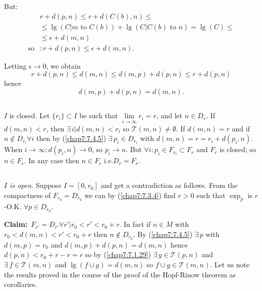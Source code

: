 But:
\begin{align*}
& r+d(p,n)\leq r+d(C(b),n)\leq\\
&\leq\lg(C|m\text{ \  to \ }C(b))+\lg(C|C(b)\text{ \ to
    \ }n)=\lg(C)\leq\\
&\leq \epsilon+d(m,n)\\
\text{so} &: r+d(p,n)\leq \epsilon+d(m,n). 
\end{align*}

Letting $\epsilon\to 0$, we obtain
$$
r+d(p,n)\leq d(m,n)\leq d(m,p)+d(p,n)\leq r+d(p,n)
$$
hence
$$
d(m,p)+d(p,n)=d(m,n).
$$

\setcounter{subsection}{5}
\subsection{}\label{chap7:7.4.6}
$I$ is closed. Let $\{r_{i}\}\subset I$ be such that
$\lim\limits_{i\to \infty} r_{i}=r$, and \pageoriginale let $n\in
D_{r}$. If $d(m,n)<r$, then $\exists\, i|d(m,n)<r_{i}$ so
$\mathscr{T}(m,n)\neq \emptyset$. If $d(m,n)=r$ and if $n\not\in
D_{r_{i}}\forall i$ then by (\ref{chap7:7.4.5}) $\exists\, p_{i}\in
D_{r_{i}}$ with $d(m,n)=r=r_{i}+d(p_{i},n)$. When $i\to
\infty:d(p_{i},n)\to 0$, so $p_{i}\to n$. But $\forall i:p_{i}\in
F_{r_{i}}\subset F_{r}$ and $F_{r}$ is closed; so $n\in F_{r}$. In any
case then $n\in F_{r}$ i.e.\@ $D_{r}=F_{r}$.

\subsection{}\label{chap7:7.4.7}
{\em $I$ is open.} Suppose $I=[0,r_{0}]$ and get a contradiction as
follows. From the compactness of $F_{r_{0}}=D_{r_{0}}$ we can by
(\ref{chap7:7.3.4}) find $r>0$ such that $\exp_{p}$ is $r$-O.K. $\forall
p\in D_{r_{0}}$.

\noindent
{\bf Claim:}~$F_{r'}=D_{r'}\forall r'|r_{0}<r'<r_{0}+r$. In fact if
$n\in M$ with $r_{0}<d(m,n)<r'<r_{0}+r$ then $n\not\in D_{r_{0}}$. By
(\ref{chap7:7.4.5}) $\exists\, p$ with $d(m,p)=r_{0}$ and
$d(m,p)+d(p,n)=d(m,n)$ hence $d(p,n)<r_{0}+r-r=r$ so by
(\ref{chap7:7.1.29}) $\exists\, g\in\mathscr{T}(p,n)$ and $\exists\,
f\in\mathscr{T}(m,n)$ and $\lg(f\cup g)=d(m,n)$ so $f\cup
g\in\mathscr{T}(m,n)$. Let us note the results proved in the course of
the proof of the Hopf-Rinow theorem as corollaries.

\subsection{}\label{chap7:7.4.8}

